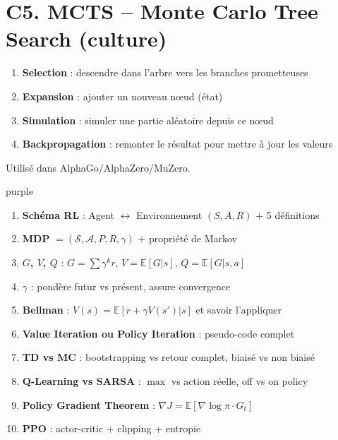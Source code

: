 \documentclass[11pt,a4paper]{article}
\newcommand{\E}{\mathbb{E}}
\begin{document}
\section{C5. MCTS -- Monte Carlo Tree Search (culture)}

\begin{formbox}
\begin{enumerate}[nosep]
\item \textbf{Selection} : descendre dans l'arbre vers les branches prometteuses
\item \textbf{Expansion} : ajouter un nouveau n\oe{}ud (état)
\item \textbf{Simulation} : simuler une partie aléatoire depuis ce n\oe{}ud
\item \textbf{Backpropagation} : remonter le résultat pour mettre à jour les valeurs
\end{enumerate}
Utilisé dans AlphaGo/AlphaZero/MuZero.
\end{formbox}

\newpage

\begin{tierbox}{purple}
\end{tierbox}

\begin{formbox}
\begin{enumerate}[nosep]
\item \textbf{Schéma RL} : Agent $\leftrightarrow$ Environnement $(S, A, R)$ + 5 définitions
\item \textbf{MDP} $= (\mathcal{S}, \mathcal{A}, P, R, \gamma)$ + propriété de Markov
\item \textbf{$G$, $V$, $Q$} : $G = \sum \gamma^k r$, \; $V = \E[G|s]$, \; $Q = \E[G|s,a]$
\item \textbf{$\gamma$} : pondère futur vs présent, assure convergence
\item \textbf{Bellman} : $V(s) = \E[r + \gamma V(s')|s]$ et savoir l'appliquer
\item \textbf{Value Iteration ou Policy Iteration} : pseudo-code complet
\item \textbf{TD vs MC} : bootstrapping vs retour complet, biaisé vs non biaisé
\item \textbf{Q-Learning vs SARSA} : $\max$ vs action réelle, off vs on policy
\item \textbf{Policy Gradient Theorem} : $\nabla J = \E[\nabla\log\pi \cdot G_t]$
\item \textbf{PPO} : actor-critic + clipping + entropie
\end{enumerate}
\end{formbox}
\end{document}
